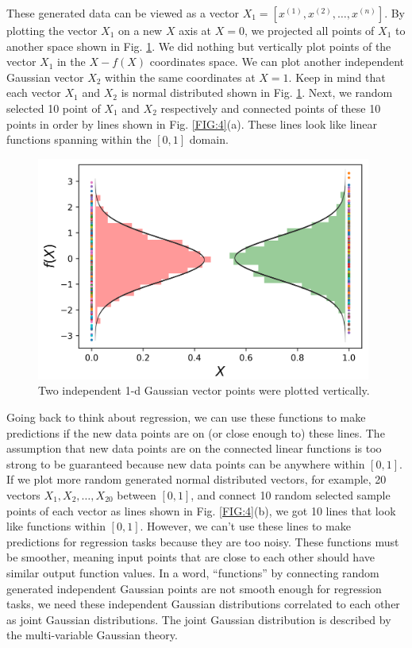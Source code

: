 \documentclass[12pt,letterpaper,fleqn,oneside,titlepage]{offroad-report}
\begin{document}
These generated data can be viewed as a vector $X_1=[x^{(1)}, x^{(2)}, \ldots, x^{(n)}]$. By plotting the vector $X_1$ on a new $X$ axis at $X = 0$, we projected all points of $X_1$ to another space shown in Fig. \ref{FIG:3}. We did nothing but vertically plot points of the vector $X_1$ in the $X-f(X)$ coordinates space. We can plot another independent Gaussian vector $X_2$ within the same coordinates at $X = 1$. Keep in mind that each vector $X_1$ and $X_2$ is normal distributed shown in Fig. \ref{FIG:3}. Next, we random selected 10 point of $X_1$ and $X_2$ respectively and connected points of these 10 points in order by lines shown in Fig. \ref{FIG:4}(a). These lines look like linear functions spanning within the $[0, 1]$ domain.
\begin{figure}[h!]
	\centering
		\includegraphics[width=11.0cm]{figs/2gaussian.png}
	\caption{Two independent 1-d Gaussian vector points were plotted vertically.}
	\label{FIG:3}
\end{figure}
Going back to think about regression, we can use these functions to make predictions if the new data points are on (or close enough to) these lines. The assumption that new data points are on the connected linear functions is too strong to be guaranteed because new data points can be anywhere within $[0, 1]$. If we plot more random generated normal distributed vectors, for example, 20 vectors $X_1, X_2, \ldots, X_{20}$ between $[0, 1]$, and connect 10 random selected sample points of each vector as lines shown in Fig. \ref{FIG:4}(b), we got 10 lines that look like functions within $[0, 1]$. However, we can't use these lines to make predictions for regression tasks because they are too noisy. These functions must be smoother, meaning input points that are close to each other should have similar output function values. In a word, ``functions'' by connecting random generated independent Gaussian points are not smooth enough for regression tasks, we need these independent Gaussian distributions correlated to each other as joint Gaussian distributions. The joint Gaussian distribution is described by the multi-variable Gaussian theory.  
\end{document}
